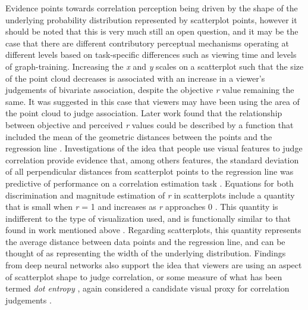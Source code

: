 \documentclass[manuscript, review, anonymous, screen]{acmart}
\begin{document}
Evidence points towards correlation perception being driven by the shape
of the underlying probability distribution represented by scatterplot
points, however it should be noted that this is very much still an open
question, and it may be the case that there are different contributory
perceptual mechanisms operating at different levels based on
task-specific differences such as viewing time and levels of
graph-training. Increasing the \emph{x} and \emph{y} scales on a
scatterplot such that the size of the point cloud decreases
\citep{cleveland_1982} is associated with an increase in a viewer's
judgements of bivariate association, despite the objective \emph{r}
value remaining the same. It was suggested in this case that viewers may
have been using the area of the point cloud to judge association. Later
work found that the relationship between objective and perceived
\emph{r} values could be described by a function that included the mean
of the geometric distances between the points and the regression line
\citep{meyer_1997}. Investigations of the idea that people use visual
features to judge correlation provide evidence that, among others
features, the standard deviation of all perpendicular distances from
scatterplot points to the regression line was predictive of performance
on a correlation estimation task \citep{yang_2019}. Equations for both
discrimination and magnitude estimation of \emph{r} in scatterplots
include a quantity that is small when \emph{r} = 1 and increases as
\emph{r} approaches 0 \citep{rensink_2017}. This quantity is indifferent
to the type of visualization used, and is functionally similar to that
found in work mentioned above
\citep{cleveland_1982, meyer_1997, yang_2019}. Regarding scatterplots,
this quantity represents the average distance between data points and
the regression line, and can be thought of as representing the width of
the underlying distribution. Findings from deep neural networks also
support the idea that viewers are using an aspect of scatterplot shape
to judge correlation, or some measure of what has been termed \emph{dot
entropy} \citep{yang_2023}, again considered a candidate visual proxy
for correlation judgements \citep{rensink_2017, rensink_2022}.
\end{document}

